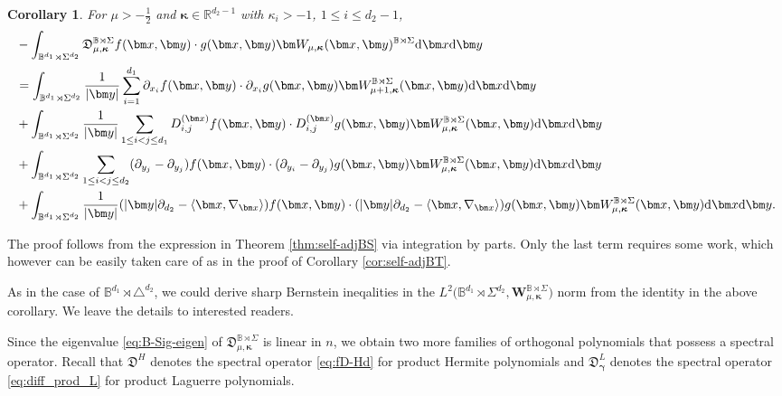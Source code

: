 \documentclass{amsart}
\newtheorem{cor}[thm]{Corollary}
\theoremstyle{remark}
\def\la{{\langle}}
\def\ra{{\rangle}}
\def\d{\mathrm{d}}
\def\fD{{\mathfrak D}}
\def\k{{\kappa}}
\def\la{{\langle}}
\def\ra{{\rangle}}
\def\xb{{\bm x}}
\def\yb{{\bm y}}
\def\BB{{\mathbb B}}
\def\RR{{\mathbb R}}
\def\bg{{\boldsymbol{\gamma}}}
\def\bk{{\boldsymbol{\kappa}}}
\def\f{\frac}
\begin{document}
\begin{cor} \label{cor:B-Sig_surface}
For $\mu > -\f12$ and $\bk \in \RR^{d_2-1}$ with $\k_i > -1$, $1 \le i \le d_2-1$,
\begin{align*} %
   & - \int_{\BB^{d_1} \rtimes \Sigma^{d_2}}\fD_{\mu, \bk}^{\BB\rtimes\Sigma}
     f (\bm x,\bm y) \cdot g(\bm x, \bm y) \bm W_{\mu, \bk}(\bm x, \bm y)^{\BB\rtimes\Sigma} \d \bm x \d \bm y  \\
  &  = \int_{\BB^{d_1} \rtimes \Sigma^{d_2}}  \frac{1}{|\bm y|} \sum_{i=1}^{d_1} \partial_{x_i} f(\bm x,\bm y)\cdot \partial_{x_i} g(\bm x,\bm y) 
  \bm W_{\mu+1,\bk}^{\BB\rtimes \Sigma}(\bm x,\bm y)  \d \bm x \d \bm y  \notag \\ 
  & +  \int_{\BB^{d_1} \rtimes \Sigma^{d_2}}  \frac{1}{|\bm y|} \sum_{1 \le i< j \le d_1}  D_{i,j}^{(\bm x)} f(\bm x, \bm y) \cdot D_{i,j}^{(\bm x)} g(\bm x, \bm y) 
  \bm W_{\mu,\bk}^{\BB\rtimes \Sigma}(\bm x,\bm y)  \d \bm x \d \bm y  \notag \\ 
  & + \int_{\BB^{d_1} \rtimes \Sigma^{d_2}}   \sum_{1\le i< j \le d_2} (\partial_{y_j} - \partial_{y_j}) f(\bm x,\bm y) \cdot 
    (\partial_{y_i} - \partial_{y_j})g(\bm x,\bm y)
  \bm W_{\mu,\bk}^{\BB\rtimes \Sigma}(\bm x,\bm y) \d \bm x \d \bm y  \notag \\
  &  +  \int_{\BB^{d_1} \rtimes \Sigma^{d_2}} \frac{1}{|\bm y|} (|\yb| \partial_{d_2} - \la \xb,\nabla_\xb\ra) f(\bm x,\bm y) 
  \cdot (|\yb| \partial_{d_2} - \la \xb,\nabla_\xb\ra)g(\bm x,\bm y) 
  \bm W_{\mu,\bk}^{\BB\rtimes \Sigma}(\bm x,\bm y)  \d \bm x \d \bm y.  \notag
 \end{align*}
\end{cor} 

The proof follows from the expression in Theorem \ref{thm:self-adjBS} via integration by parts. Only the last term requires 
some work, which however can be easily taken care of as in the proof of Corollary \ref{cor:self-adjBT}. 

As in the case of $\BB^{d_1} \rtimes \triangle^{d_2}$, we could derive sharp Bernstein ineqalities in the 
$L^2\big(\BB^{d_1}\rtimes\Sigma^{d_2},  \bm W_{\mu,\bk}^{\BB\rtimes \Sigma}\big)$ norm from the identity
in the above corollary. We leave the details to interested readers. 

Since the eigenvalue \eqref{eq:B-Sig-eigen} of $\fD_{\mu,\bk}^{\BB\rtimes \Sigma}$ is linear in $n$, we obtain two
more families of orthogonal polynomials that possess a spectral operator. Recall that $\fD^H$ denotes the spectral
operator \eqref{eq:fD-Hd} for product Hermite polynomials and $\fD_\bg^L$ denotes the spectral operator  
\eqref{eq:diff_prod_L} for product Laguerre polynomials. 
\end{document}
